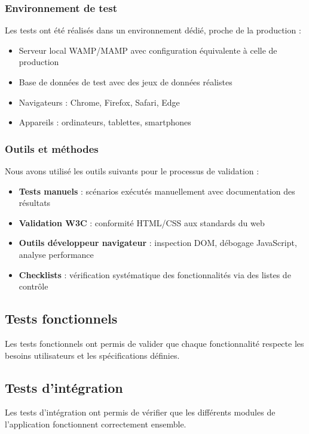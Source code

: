 \documentclass[a4paper,12pt]{article}
\begin{document}
\subsubsection{Environnement de test}
Les tests ont été réalisés dans un environnement dédié, proche de la production :
\begin{itemize}
  \item Serveur local WAMP/MAMP avec configuration équivalente à celle de production
  \item Base de données de test avec des jeux de données réalistes
  \item Navigateurs : Chrome, Firefox, Safari, Edge
  \item Appareils : ordinateurs, tablettes, smartphones
\end{itemize}

\subsubsection{Outils et méthodes}
Nous avons utilisé les outils suivants pour le processus de validation :
\begin{itemize}
  \item \textbf{Tests manuels} : scénarios exécutés manuellement avec documentation des résultats
  \item \textbf{Validation W3C} : conformité HTML/CSS aux standards du web
  \item \textbf{Outils développeur navigateur} : inspection DOM, débogage JavaScript, analyse performance
  \item \textbf{Checklists} : vérification systématique des fonctionnalités via des listes de contrôle
\end{itemize}

\subsection{Tests fonctionnels}
Les tests fonctionnels ont permis de valider que chaque fonctionnalité respecte les besoins utilisateurs et les spécifications définies.
\subsection{Tests d'intégration}
Les tests d'intégration ont permis de vérifier que les différents modules de l'application fonctionnent correctement ensemble.
\end{document}
